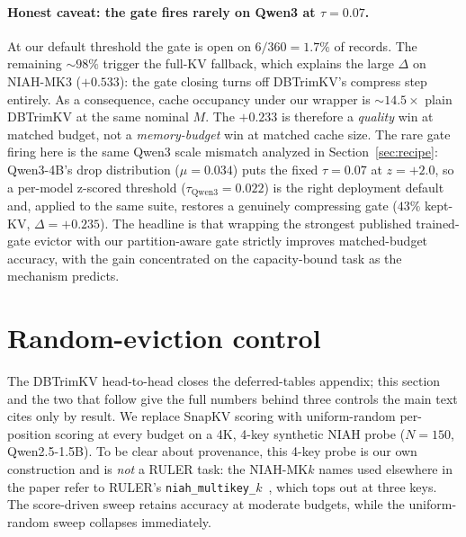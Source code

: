 \paragraph{Honest caveat: the gate fires rarely on Qwen3 at $\tau = 0.07$.}
At our default threshold the gate is open on $6/360 = 1.7\%$ of
records. The remaining $\sim 98\%$ trigger the full-KV fallback, which
explains the large $\Delta$ on NIAH-MK3 ($+0.533$): the gate closing
turns off DBTrimKV's compress step entirely. As a consequence, cache
occupancy under our wrapper is $\sim 14.5 \times$ plain DBTrimKV at the
same nominal $M$. The $+0.233$ is therefore a \emph{quality} win at
matched budget, not a \emph{memory-budget} win at matched cache size.
The rare gate firing here is the same Qwen3 scale mismatch analyzed in
Section~\ref{sec:recipe}: Qwen3-4B's drop distribution ($\mu = 0.034$)
puts the fixed $\tau = 0.07$ at $z = +2.0$, so a per-model z-scored
threshold ($\tau_{\text{Qwen3}} = 0.022$) is the right deployment
default and, applied to the same suite, restores a genuinely
compressing gate ($43\%$ kept-KV, $\Delta = +0.235$). The headline is that wrapping the strongest
published trained-gate evictor with our partition-aware gate
strictly improves matched-budget accuracy, with the gain concentrated
on the capacity-bound task as the mechanism predicts.


\section{Random-eviction control}
\label{app:random}

The DBTrimKV head-to-head closes the deferred-tables appendix; this
section and the two that follow give the full numbers behind three
controls the main text cites only by result. We replace SnapKV scoring
with uniform-random per-position scoring at every budget on a 4K, 4-key
synthetic NIAH probe ($N = 150$, Qwen2.5-1.5B). To be clear about
provenance, this 4-key probe is our own construction and is \emph{not} a
RULER task: the NIAH-MK$k$ names used elsewhere in the paper refer to
RULER's \texttt{niah\_multikey\_$k$}~\citep{arxiv240406654}, which tops
out at three keys. The score-driven sweep retains accuracy at moderate
budgets, while the uniform-random sweep collapses immediately.

